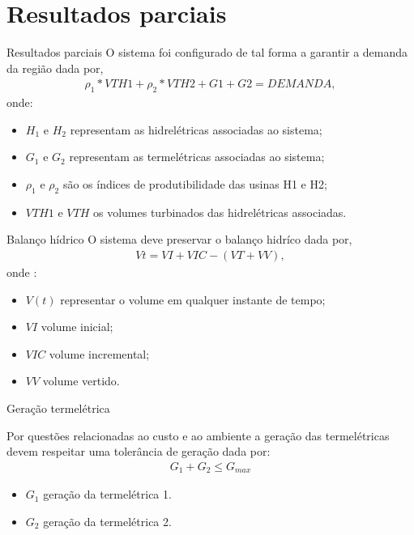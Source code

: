 \documentclass[12pt]{beamer}%
\begin{document}
\section{Resultados parciais}
\begin{frame}{Resultados parciais}
O sistema foi configurado de tal forma a garantir a demanda da regi\~ao dada por,
\begin{align*}
{\rho}_1*VTH1 + {\rho}_2*VTH2 + G1 + G2 = DEMANDA,
\end{align*}
onde:
\begin{itemize}
		\justifying
	\item $H_1$ e $H_2$ representam as hidrel\'etricas associadas ao sistema;
	\item $G_1$ e $G_2$ representam as termel\'etricas associadas ao sistema;
	\item $\rho_1$ e $\rho_2$ s\~ao os \'indices de produtibilidade das usinas H1 e H2;
	\item $VTH1$ e $VTH$  os volumes turbinados das hidrel\'etricas associadas.
\end{itemize}
\end{frame}
\begin{frame}{Balan\c co h\'idrico}
O sistema deve preservar o balan\c co hidr\'ico dada por,
{\setlength{\belowdisplayskip}{-4pt}
\begin{align*}
  \displaystyle Vt = VI + VIC - \left( VT + VV \right), 
\end{align*}}
onde : 
\begin{itemize}
		\justifying
	\item $V(t)$ representar o volume em qualquer instante de tempo;
	\item $VI$  volume inicial;
	\item $VIC$ volume incremental;
	\item $VV$ volume vertido.
\end{itemize}
\end{frame}
\begin{frame}{Gera\c c\~ao termel\'etrica}
\begin{justify}	
Por quest\~oes relacionadas ao custo e ao ambiente a gera\c c\~ao das termel\'etricas devem respeitar uma toler\^ancia de
gera\c c\~ao dada por:
\begin{align*}
	G_1 + G_2 \leq G_{max}
\end{align*}
\begin{itemize}
		\justifying
	\item $G_1$ gera\c c\~ao da termel\'etrica 1.
	\item $G_2$ gera\c c\~ao da termel\'etrica 2.
\end{itemize}
\end{justify}	
\end{frame}
\end{document}
